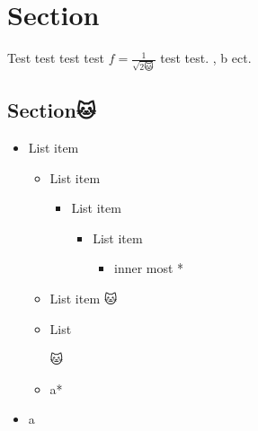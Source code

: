 \documentclass{xyz}
\begin{document}
    \section{Section}
    Test test test test $f = \frac{1}{\sqrt{2🐱}}$ test test. \a, \🐱b ect.

    \subsection{Section🐱}
    \begin{center🐱}
        \begin{itemize}
            \item List item 
            \begin{itemize}
                \item List item 
                \begin{itemize}
                    \item List item 
                    \begin{itemize}
                        \item List item 
                        \begin{itemize}
                            \item inner most *
                        \end{itemize}
                    \end{itemize}
                \end{itemize}
                \item List item 🐱
                \item {List 
                 
                 
                 
                 
                 
                🐱}
                \item a*
            \end{itemize}
            \item a
        \end{itemize}
    \end{center🐱}

\end{document}
